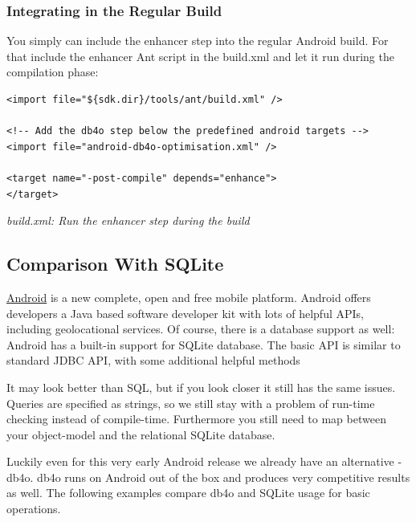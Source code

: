 \subsubsection*{Integrating in the Regular Build}

You simply can include the enhancer step into the regular Android build. For that include the enhancer Ant script in the build.xml and let it run during the compilation phase:

\begin{lstlisting}
<import file="${sdk.dir}/tools/ant/build.xml" />

<!-- Add the db4o step below the predefined android targets -->
<import file="android-db4o-optimisation.xml" />

<target name="-post-compile" depends="enhance">
</target>
\end{lstlisting}

{\small\itshape build.xml: Run the enhancer step during the build\par}
\medskip

\subsection{Comparison With SQLite}
\label{ref:platform-specific-issues-android-comparison-with-sqlite}

\href{https://developer.android.com/}{Android} is a new complete, open and free mobile platform. Android offers developers a Java based software developer kit with lots of helpful APIs, including geolocational services. Of course, there is a database support as well: Android has a built-in support for SQLite database. The basic API is similar to standard JDBC API, with some additional helpful methods\newline{}

It may look better than SQL, but if you look closer it still has the same issues. Queries are specified as strings, so we still stay with a problem of run-time checking instead of compile-time. Furthermore you still need to map between your object-model and the relational SQLite database.

Luckily even for this very early Android release we already have an alternative - db4o. db4o runs on Android out of the box and produces very competitive results as well. The following examples compare db4o and SQLite usage for basic operations.

